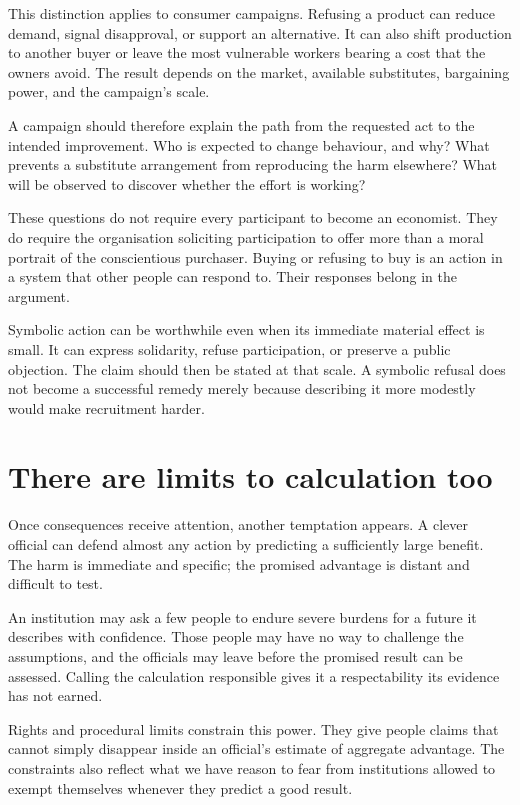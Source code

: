 \documentclass[12pt,a4paper]{book}
\begin{document}
This distinction applies to consumer campaigns. Refusing a product can reduce demand, signal disapproval, or support an alternative. It can also shift production to another buyer or leave the most vulnerable workers bearing a cost that the owners avoid. The result depends on the market, available substitutes, bargaining power, and the campaign's scale.

A campaign should therefore explain the path from the requested act to the intended improvement. Who is expected to change behaviour, and why? What prevents a substitute arrangement from reproducing the harm elsewhere? What will be observed to discover whether the effort is working?

These questions do not require every participant to become an economist. They do require the organisation soliciting participation to offer more than a moral portrait of the conscientious purchaser. Buying or refusing to buy is an action in a system that other people can respond to. Their responses belong in the argument.

Symbolic action can be worthwhile even when its immediate material effect is small. It can express solidarity, refuse participation, or preserve a public objection. The claim should then be stated at that scale. A symbolic refusal does not become a successful remedy merely because describing it more modestly would make recruitment harder.

\section*{There are limits to calculation too}

Once consequences receive attention, another temptation appears. A clever official can defend almost any action by predicting a sufficiently large benefit. The harm is immediate and specific; the promised advantage is distant and difficult to test.

An institution may ask a few people to endure severe burdens for a future it describes with confidence. Those people may have no way to challenge the assumptions, and the officials may leave before the promised result can be assessed. Calling the calculation responsible gives it a respectability its evidence has not earned.

Rights and procedural limits constrain this power. They give people claims that cannot simply disappear inside an official's estimate of aggregate advantage. The constraints also reflect what we have reason to fear from institutions allowed to exempt themselves whenever they predict a good result.
\end{document}
